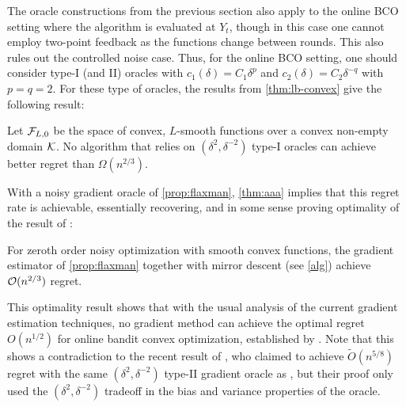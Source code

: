 The oracle constructions from the previous section also apply to the online BCO setting
where the algorithm is evaluated at $Y_t$, though in this case 
one cannot employ two-point feedback as the functions change between rounds. 
This also rules out the controlled noise case. 
Thus, for the online BCO setting, one should consider type-I (and II) oracles with $c_1(\delta) = C_1 \delta^p$ and $c_2(\delta) = C_2\delta^{-q}$ with $p=q=2$.
For these type of oracles, the results from \cref{thm:lb-convex} give the following result: 
\begin{theorem}\label{thm:aaa}
Let $\mathcal{F}_{L,0}$ be the space of convex, $L$-smooth functions over a convex non-empty domain $\mathcal{K}$.
No algorithm that relies on 
 $(\delta^2,\delta^{-2})$ type-I oracles
 can achieve better regret than $\Omega(n^{2/3})$.
\end{theorem}
With a noisy gradient oracle of \cref{prop:flaxman}, \cref{thm:aaa} implies that this regret rate is achievable, essentially recovering, and in some sense proving optimality of the result of \citet{saha2011improved}:
\begin{theorem}
For zeroth order noisy optimization with smooth convex functions, the gradient estimator of \cref{prop:flaxman} together with mirror descent (see \cref{alg}) achieve $\mathcal{O}(n^{2/3})$ regret.
\end{theorem}
This optimality result shows that with the usual analysis of the current gradient estimation techniques, no gradient method can achieve the optimal regret $O(n^{1/2})$ for online bandit convex optimization, established by \citet{BubeckDKP15,BuEl15}. Note that this shows a contradiction to the recent result of \citet{DeElKo15}, who claimed to achieve $\tilde{O}(n^{5/8})$ regret with the same $(\delta^2,\delta^{-2})$ type-II gradient oracle as \citet{saha2011improved}, but their proof only used the $(\delta^2,\delta^{-2})$ tradeoff in the bias and variance properties of the oracle.





